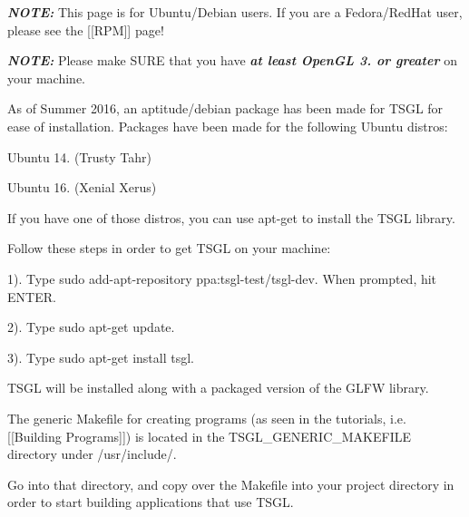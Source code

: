 {\itshape {\bfseries{N\+O\+TE\+:}}} This page is for Ubuntu/\+Debian users. If you are a Fedora/\+Red\+Hat user, please see the \mbox{[}\mbox{[}R\+PM\mbox{]}\mbox{]} page!

{\itshape {\bfseries{N\+O\+TE\+:}}} Please make S\+U\+RE that you have {\itshape {\bfseries{at least Open\+GL 3. or greater}}} on your machine.

As of Summer 2016, an aptitude/debian package has been made for T\+S\+GL for ease of installation. Packages have been made for the following Ubuntu distros\+:


\begin{DoxyItemize}
\item Ubuntu 14. (Trusty Tahr)
\item Ubuntu 16. (Xenial Xerus)
\end{DoxyItemize}

If you have one of those distros, you can use {\ttfamily apt-\/get} to install the T\+S\+GL library.

Follow these steps in order to get T\+S\+GL on your machine\+:

1). Type {\ttfamily sudo add-\/apt-\/repository ppa\+:tsgl-\/test/tsgl-\/dev}. When prompted, hit {\ttfamily E\+N\+T\+ER}.

2). Type {\ttfamily sudo apt-\/get update}.

3). Type {\ttfamily sudo apt-\/get install tsgl}.

T\+S\+GL will be installed along with a packaged version of the G\+L\+FW library.

The generic {\ttfamily Makefile} for creating programs (as seen in the tutorials, i.\+e. \mbox{[}\mbox{[}Building Programs\mbox{]}\mbox{]}) is located in the {\ttfamily T\+S\+G\+L\+\_\+\+G\+E\+N\+E\+R\+I\+C\+\_\+\+M\+A\+K\+E\+F\+I\+LE} directory under {\ttfamily /usr/include/}.

Go into that directory, and copy over the {\ttfamily Makefile} into your project directory in order to start building applications that use T\+S\+GL. ~\newline
 